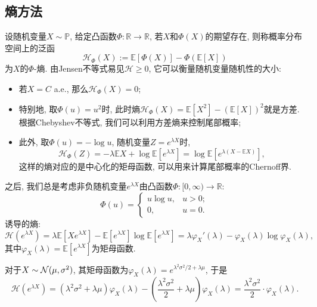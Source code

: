 \subsection{熵方法}

设随机变量$X \sim \mathbb{P}$, 给定凸函数$\Phi \colon \mathbb{R} \to \mathbb{R}$, 若$X$和$\Phi(X)$的期望存在, 则称概率分布空间上的泛函
\begin{equation*}
	\mathcal{H}_\Phi(X) := \mathbb{E}[\Phi(X)] - \Phi(\mathbb{E}[X])  
\end{equation*}
为$X$的$\Phi$-熵.
由Jensen不等式易见$\mathcal{H} \geq 0$, 它可以衡量随机变量随机性的大小: 
\begin{itemize}
	\item 若$X = C$ a.e., 那么$\mathcal{H}_\Phi (X) = 0$; 
	\item 特别地, 取$\Phi(u) = u^2$时, 此时熵$\mathcal{H}_\Phi(X) = \mathbb{E}[X^2] - (\mathbb{E}[X])^2$就是方差. 根据Chebyshev不等式, 我们可以利用方差熵来控制尾部概率; 
	\item 此外, 取$\Phi(u) = - \log u$, 随机变量$Z = e^{\lambda X}$时, 
		\begin{equation*}
			\mathcal{H}_\Phi(Z) 
			= - \lambda \mathbb{E}X + \log \mathbb{E}[e^{\lambda X}] 
			= \log \mathbb{E}[e^{\lambda(X - \mathbb{E}X)}], 
		\end{equation*}
		这样的熵对应的是中心化的矩母函数, 可以用来计算尾部概率的Chernoff界. 
\end{itemize}
之后, 我们总是考虑非负随机变量$e^{\lambda X}$由凸函数$\Phi \colon [0, \infty) \to \mathbb{R}$: 
\begin{equation*}
	\Phi(u) = 
	\begin{cases}
		u \log u, & u > 0; \\ 0, & u = 0. 
	\end{cases}
\end{equation*}
诱导的熵: 
\begin{equation}\label{eq:EntropyByMGF}
	\mathcal{H}(e^{\lambda X}) 
	= \lambda \mathbb{E}[ X e^{\lambda X}] - \mathbb{E}[e^{\lambda X}] \log \mathbb{E}[e^{\lambda X}]
	= \lambda \varphi_X'(\lambda) - \varphi_X(\lambda) \log \varphi_X(\lambda), 
\end{equation}
其中$\varphi_X(\lambda) = \mathbb{E}[e^{\lambda X}]$为矩母函数. 

\begin{example}[Gauss随机变量的熵]
	对于$X \sim \mathcal{N}(\mu, \sigma^2)$, 其矩母函数为$\varphi_X(\lambda) = e^{\lambda^2 \sigma^2 / 2 + \lambda \mu}$, 于是
	\begin{equation}\label{eq:EntropyOfGaussianRV}
		\mathcal{H}(e^{\lambda X}) 
		= (\lambda^2 \sigma^2 + \lambda \mu) \varphi_X(\lambda) - \left(\frac{\lambda^2 \sigma^2}{2} + \lambda\mu\right) \varphi_X(\lambda) 
		= \frac{\lambda^2 \sigma^2}{2} \cdot \varphi_X(\lambda). 
	\end{equation}
\end{example}

